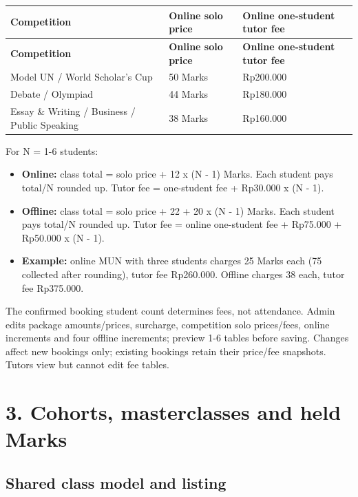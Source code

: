 \documentclass[11pt,a4paper]{article}
\begin{document}
{\small
\begin{longtable}{|L{28.54mm}|L{52.57mm}|L{69.09mm}|}
\hline
\textbf{Competition} & \textbf{Online solo price} & \textbf{Online one-student tutor fee} \\ \hline
\endfirsthead
\hline
\textbf{Competition} & \textbf{Online solo price} & \textbf{Online one-student tutor fee} \\ \hline
\endhead
Model UN /\allowbreak{} World Scholar's Cup & 50 Marks & Rp200.000 \\ \hline
Debate /\allowbreak{} Olympiad & 44 Marks & Rp180.000 \\ \hline
Essay \& Writing /\allowbreak{} Business /\allowbreak{} Public Speaking & 38 Marks & Rp160.000 \\ \hline
\end{longtable}
}

For N = 1-6 students:

\begin{itemize}
\item \textbf{Online:} class total = solo price + 12  x  (N - 1) Marks. Each student pays total/\allowbreak{}N rounded up. Tutor fee = one-student fee + Rp30.000  x  (N - 1).
\item \textbf{Offline:} class total = solo price + 22 + 20  x  (N - 1) Marks. Each student pays total/\allowbreak{}N rounded up. Tutor fee = online one-student fee + Rp75.000 + Rp50.000  x  (N - 1).
\item \textbf{Example:} online MUN with three students charges 25 Marks each (75 collected after rounding), tutor fee Rp260.000. Offline charges 38 each, tutor fee Rp375.000.
\end{itemize}

The confirmed booking student count determines fees, not attendance. Admin edits package amounts/\allowbreak{}prices, surcharge, competition solo prices/\allowbreak{}fees, online increments and four offline increments; preview 1-6 tables before saving. Changes affect new bookings only; existing bookings retain their price/\allowbreak{}fee snapshots. Tutors view but cannot edit fee tables.

\section*{3. Cohorts, masterclasses and held Marks}

\subsection*{Shared class model and listing}
\end{document}
